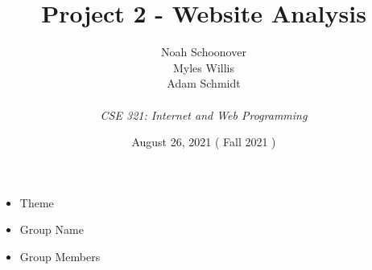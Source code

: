 \documentclass[12pt]{article}%
\def\assignmentName { Project 2 - Website Analysis                      }
\def\className      { CSE 321: Internet and Web Programming             }
\def\studentName    { Noah Schoonover \\ Myles Willis \\ Adam Schmidt   }
\def\studentEmail   {  }
\def\dueDate        { August 26, 2021                                   }
\def\semesterDate   { Fall 2021                                         }
\begin{document}


\begin{singlespace}
\title{ \assignmentName }
\author{ \studentName \\ {\small \studentEmail} \\ {\it \className}}
\date{\dueDate (\semesterDate)}
\maketitle
\end{singlespace}



\begin{itemize}
    \item Theme
    \item Group Name
    \item Group Members
\end{itemize}
\end{document}
